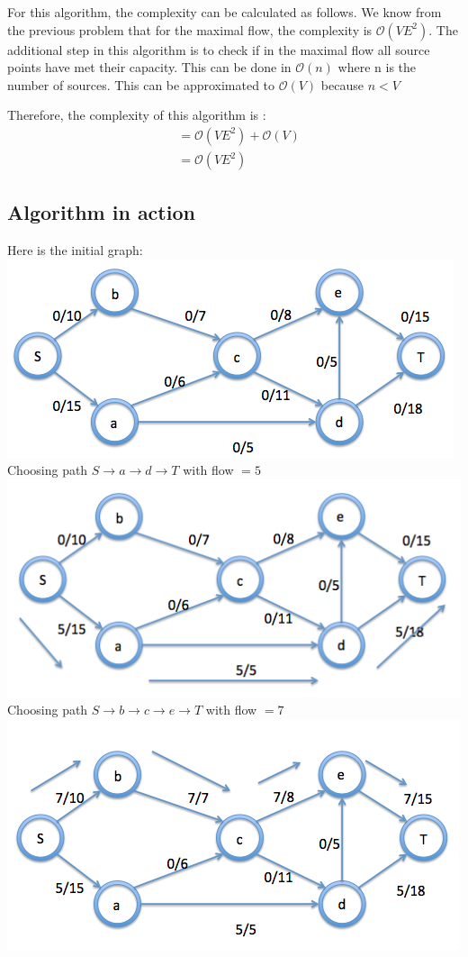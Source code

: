 \documentclass{article}
\begin{document}
For this algorithm, the complexity can be calculated as follows. We know from the previous problem that for the maximal flow, the complexity is $\mathcal{O}(VE^2)$. The additional step in this algorithm is to check if in the maximal flow all source points have met their capacity. This can be done in $\mathcal{O}(n)$ where n is the number of sources. This can be approximated to $\mathcal{O}(V)$ because $n < V$

Therefore, the complexity of this algorithm is :
\begin{align*}
 & = \mathcal{O}(VE^2) + \mathcal{O}(V) \\
 & = \mathcal{O}(VE^2)
\end{align*}

\newpage
\subsection{Algorithm in action}
Here is the initial graph:
\newline
\includegraphics[width=\linewidth]{images/1}
Choosing path $S \rightarrow a \rightarrow d \rightarrow T$ with flow $= 5$
\newline
\includegraphics[width=\linewidth]{images/2}
Choosing path $S \rightarrow b \rightarrow c \rightarrow  e \rightarrow T$ with flow $= 7$
\newline
\includegraphics[width=\linewidth]{images/3}
\end{document}
